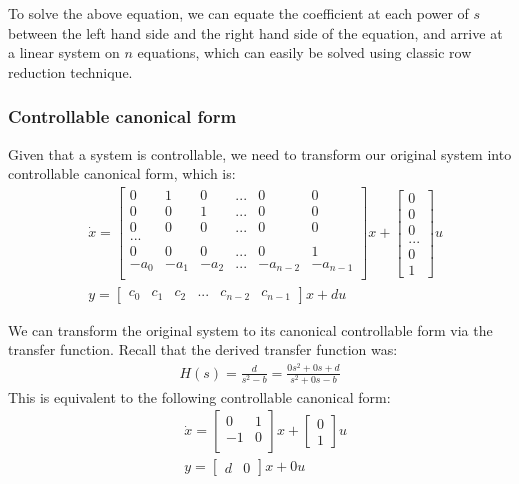 \documentclass [12pt,letterpaper]{exam}
\begin{document}
To solve the above equation, we can equate the coefficient at each power of $s$ between the left hand side and the right hand side of the equation, and arrive at a linear system on $n$ equations, which can easily be solved using classic row reduction technique.

\subsubsection{Controllable canonical form}
Given that a system is controllable, we need to transform our original system into controllable canonical form, which is:
\begin{align}
& \dot{x} = \begin{bmatrix}
0 & 1 & 0 & ... & 0 & 0 \\
0 & 0 & 1 & ... & 0 & 0 \\
0 & 0 & 0 & ... & 0 & 0 \\
... \\
0 & 0 & 0 & ... & 0 & 1 \\
-a_0 & -a_1 & -a_2 & ... & -a_{n-2} & -a_{n-1} \\
\end{bmatrix} x + \begin{bmatrix}
0 \\ 0 \\ 0 \\ ... \\ 0 \\1
\end{bmatrix} u\\
& y = \begin{bmatrix}
c_0 & c_1 & c_2 & ... & c_{n-2} & c_{n-1}
\end{bmatrix} x + du
\end{align}

We can transform the original system to its canonical controllable form via the transfer function. Recall that the derived transfer function was:
\begin{align}
H(s) = \frac{d}{s^2 - b} = \frac{0s^2 + 0s + d}{s^2 + 0s - b}
\end{align}
This is equivalent to the following controllable canonical form:
\begin{align}
& \dot{x} = \begin{bmatrix}
0 & 1 \\
-1 & 0 \\
\end{bmatrix} x + \begin{bmatrix}
0 \\1
\end{bmatrix} u\\
& y = \begin{bmatrix}
d & 0
\end{bmatrix} x + 0u
\end{align}
\end{document}
